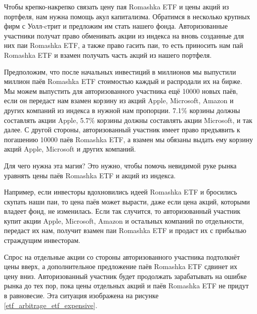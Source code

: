 Чтобы крепко-накрепко связать цену пая Romashka ETF и цены акций из портфеля, нам 
нужна помощь акул капитализма. Обратимся в несколько крупных фирм с Уолл-cтрит и 
предложим им стать  
нашего фонда. Авторизованные участники получат право обменивать акции из индекса 
на вновь созданные для них паи Romashka ETF, а также право гасить паи, то есть 
приносить нам пай Romashka ETF и взамен получать часть акций из нашего портфеля.

Предположим, что после начальных инвестиций в  миллионов мы 
выпустили миллион паёв Romashka ETF стоимостью  каждый и распродали 
их на бирже. Мы можем выпустить для авторизованного участника ещё \num{10000} 
новых паёв, если он передаст нам взамен корзину из акций Apple, Microsoft, 
Amazon и других компаний из индекса в нужной нам пропорции. 7.1\% корзины должны 
составлять акции Apple, 5.7\% корзины должны составлять акции Microsoft, и так 
далее. С другой стороны, авторизованный участник имеет право предъявить к 
погашению \num{10000} паёв Romashka ETF, а взамен мы обязаны выдать ему корзину 
акций Apple, Microsoft и других компаний.

Для чего нужна эта магия? Это нужно, чтобы помочь невидимой руке рынка уравнять 
цены паёв Romashka ETF и акций из индекса.

Например, если инвесторы вдохновились идеей Romashka ETF и бросились скупать 
наши паи, то цена паёв может вырасти, даже если цена акций, которыми владеет 
фонд, не изменилась. Если так случится, то авторизованный участник купит акции 
Apple, Microsoft, Amazon и остальных компаний по отдельности, передаст их нам, 
получит взамен паи Romashka ETF и продаст их с прибылью страждущим инвесторам.

Спрос на отдельные акции со стороны авторизованного участника подтолкнёт цены 
вверх, а дополнительное предложение паёв Romashka ETF сдвинет их цену вниз. 
Авторизованный участник будет продолжать зарабатывать на ошибке рынка до тех 
пор, пока цены отдельных акций и паёв Romashka ETF не придут в равновесие. Эта 
ситуация изображена на рисунке \ref{etf_arbitrage_etf_expensive}.

